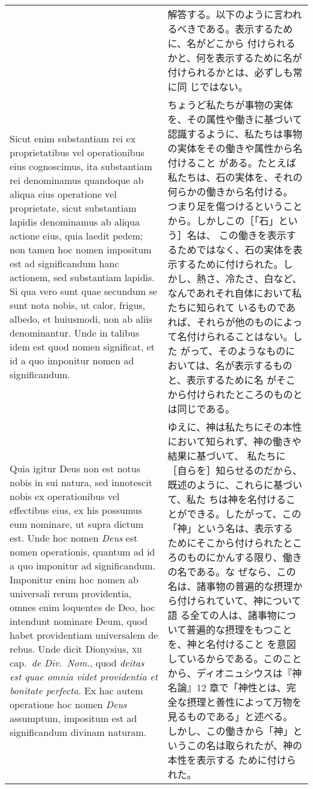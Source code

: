 \documentclass[10pt]{jsarticle} %
\begin{document}
\begin{longtable}{p{21em}p{21em}}
&

解答する。以下のように言われるべきである。表示するために、名がどこから
付けられるかと、何を表示するために名が付けられるかとは、必ずしも常に同
じではない。

\\

Sicut enim substantiam rei ex proprietatibus vel
operationibus eius cognoscimus, ita substantiam rei denominamus
quandoque ab aliqua eius operatione vel proprietate, sicut substantiam
lapidis denominamus ab aliqua actione eius, quia laedit pedem; non tamen
hoc nomen impositum est ad significandum hanc actionem, sed substantiam
lapidis. Si qua vero sunt quae secundum se sunt nota nobis, ut calor,
frigus, albedo, et huiusmodi, non ab aliis denominantur. Unde in talibus
idem est quod nomen significat, et id a quo imponitur nomen ad
significandum. 

&

ちょうど私たちが事物の実体を、その属性や働きに基づいて
認識するように、私たちは事物の実体をその働きや属性から名付けること
がある。たとえば私たちは、石の実体を、それの何らかの働きから名付ける。
つまり足を傷つけるということから。しかしこの［「石」という］名は、
この働きを表示するためではなく、石の実体を表示するために付けられた。し
かし、熱さ、冷たさ、白など、なんであれそれ自体において私たちに知られて
いるものであれば、それらが他のものによって名付けられることはない。した
がって、そのようなものにおいては、名が表示するものと、表示するために名
がそこから付けられたところのものとは同じである。


\\


Quia igitur Deus non est notus nobis in sui natura, sed
innotescit nobis ex operationibus vel effectibus eius, ex his possumus
eum nominare, ut supra dictum est. Unde hoc nomen {\itshape Deus} est nomen
operationis, quantum ad id a quo imponitur ad significandum. Imponitur
enim hoc nomen ab universali rerum providentia, omnes enim loquentes de
Deo, hoc intendunt nominare Deum, quod habet providentiam universalem de
rebus. Unde dicit Dionysius, {\scshape xii} cap.~{\itshape de Div.~Nom.}, quod {\itshape deitas est quae
omnia videt providentia et bonitate perfecta}. Ex hac autem operatione
hoc nomen {\itshape Deus} assumptum, impositum est ad significandum divinam
naturam.


& ゆえに、神は私たちにその本性において知られず、神の働きや結果に基づいて、
私たちに［自らを］知らせるのだから、既述のように、これらに基づいて、私た
ちは神を名付けることができる。したがって、この「神」という名は、表示する
 ためにそこから付けられたところのものにかんする限り、働きの名である。な
 ぜなら、この名は、諸事物の普遍的な摂理から付けられていて、神について語
 る全ての人は、諸事物について普遍的な摂理をもつことを、神と名付けること
 を意図しているからである。このことから、ディオニュシウスは『神名論』12
 章で「神性とは、完全な摂理と善性によって万物を見るものである」と述べる。
 しかし、この働きから「神」というこの名は取られたが、神の本性を表示する
 ために付けられた。


\end{longtable}
\end{document}
